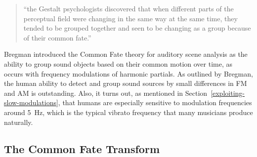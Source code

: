 \begin{quote}
``the Gestalt psychologists discovered that when different parts of the perceptual field were changing in the same way at the same time, they tended to be grouped together and seen to be changing as a group because of their common fate.'' 
\end{quote}

Bregman introduced the Common Fate theory for auditory scene analysis as the ability to group sound objects based on their common motion over time, as occurs with frequency modulations of harmonic partials.
As outlined by Bregman, the human ability to detect and group sound sources by small differences in FM and AM is outstanding.
Also, it turns out, as mentioned in Section~\ref{exploiting-slow-modulations}, that humans are especially sensitive to modulation frequencies around \SI{5}{\hertz}, which is the typical vibrato frequency that many musicians produce naturally.

\subsection{The Common Fate Transform}
\label{sub:CFT}

